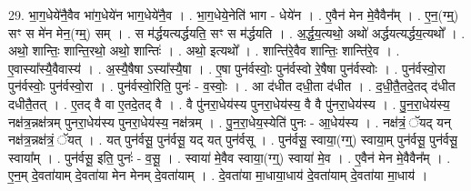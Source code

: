 \documentclass[17pt]{extarticle}
\begin{document}
29. भा॒ग॒धेये॑नै॒वैव भा॑ग॒धेये॑न भाग॒धेये॑नै॒व । . भा॒ग॒धेये॒नेति॑ भाग - धेये॑न । . ए॒वैन॑ मेन मे॒वैवैन᳚म् । . ए॒न॒(ग्म्॒) सꣳ स मे॑न मेन॒(ग्म्॒) सम् । . स म॑र्द्धयत्यर्द्धयति॒ सꣳ स म॑र्द्धयति । . अ॒र्द्ध॒य॒त्यथो॒ अथो॑ अर्द्धयत्यर्द्धय॒त्यथो᳚ । . अथो॒ शान्तिः॒ शान्ति॒रथो॒ अथो॒ शान्तिः॑ । . अथो॒ इत्यथो᳚ । . शान्ति॑रे॒वैव शान्तिः॒ शान्ति॑रे॒व । . ए॒वास्या᳚स्यै॒वैवास्य॑ । . अ॒स्यै॒षैषा ऽस्या᳚स्यै॒षा । . ए॒षा पुन॑र्वस्वोः॒ पुन॑र्वस्वो रे॒षैषा पुन॑र्वस्वोः । . पुन॑र्वस्वो॒रा पुन॑र्वस्वोः॒ पुन॑र्वस्वो॒रा । . पुन॑र्वस्वो॒रिति॒ पुनः॑ - व॒स्वोः॒ । . आ द॑धीत दधी॒ता द॑धीत । . द॒धी॒तै॒तदे॒तद् द॑धीत दधीतै॒तत् । . ए॒तद् वै वा ए॒तदे॒तद् वै । . वै पु॑नरा॒धेय॑स्य पुनरा॒धेय॑स्य॒ वै वै पु॑नरा॒धेय॑स्य । . पु॒न॒रा॒धेय॑स्य॒ नक्ष॑त्र॒न्नक्ष॑त्रम् पुनरा॒धेय॑स्य पुनरा॒धेय॑स्य॒ नक्ष॑त्रम् । . पु॒न॒रा॒धेय॒स्येति॑ पुनः - आ॒धेय॑स्य । . नक्ष॑त्रं॒ ॅयद् यन् नक्ष॑त्र॒न्नक्ष॑त्रं॒ ॅयत् । . यत् पुन॑र्वसू॒ पुन॑र्वसू॒ यद् यत् पुन॑र्वसू । . पुन॑र्वसू॒ स्वाया॒(ग्ग्॒) स्वाया॒म् पुन॑र्वसू॒ पुन॑र्वसू॒ स्वाया᳚म् । . पुन॑र्वसू॒ इति॒ पुनः॑ - व॒सू॒ । . स्वाया॑ मे॒वैव स्वाया॒(ग्ग्॒) स्वाया॑ मे॒व । . ए॒वैन॑ मेन मे॒वैवैन᳚म् । . ए॒न॒म् दे॒वता॑याम् दे॒वता॑या मेन मेनम् दे॒वता॑याम् । . दे॒वता॑या मा॒धाया॒धाय॑ दे॒वता॑याम् दे॒वता॑या मा॒धाय॑ । \newline
\end{document}
